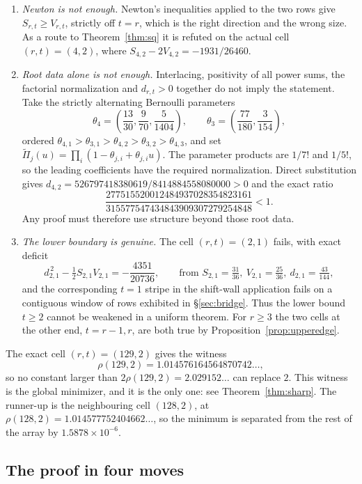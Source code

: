 \documentclass[11pt,a4paper]{article}
\theoremstyle{plain}
\theoremstyle{definition}
\theoremstyle{remark}
\begin{document}
\begin{enumerate}[label=\textup{(\alph*)},leftmargin=2.2em]
\item \emph{Newton is not enough.} Newton's inequalities applied to the two rows
  give $S_{r,t}\ge V_{r,t}$, strictly off $t=r$, which is the right direction
  and the wrong size. As a
  route to Theorem~\ref{thm:sq} it is refuted on the actual cell $(r,t)=(4,2)$,
  where $S_{4,2}-2V_{4,2}=-1931/26460$.
\item \emph{Root data alone is not enough.} Interlacing, positivity of all power
  sums, the factorial normalization and $d_{r,t}>0$ together do not imply the
  statement. Take the strictly alternating Bernoulli parameters
  \[
    \theta_4=\left(\frac{13}{30},\frac9{70},\frac5{1404}\right),\qquad
    \theta_3=\left(\frac{77}{180},\frac3{154}\right),
  \]
  ordered $\theta_{4,1}>\theta_{3,1}>\theta_{4,2}>
  \theta_{3,2}>\theta_{4,3}$, and set
  $\widetilde\Pi_j(u)=\prod_i(1-\theta_{j,i}+\theta_{j,i}u)$. The parameter
  products are $1/7!$ and $1/5!$, so the leading coefficients have the required
  normalization. Direct substitution gives
  $d_{4,2}=526797418380619/8414884558080000>0$ and the exact ratio
  \[
    \frac{277515520012484937028354823161}
         {315577547434843909307279254848}<1.
  \]
  Any proof must therefore use structure beyond those root data.
\item \emph{The lower boundary is genuine.} The cell
  $(r,t)=(2,1)$ fails, with exact deficit
  \[
    d_{2,1}^{\,2}-\tfrac12 S_{2,1}V_{2,1}=-\frac{4351}{20736},
    \qquad\text{from } S_{2,1}=\tfrac{31}{36},\ V_{2,1}=\tfrac{25}{36},\
    d_{2,1}=\tfrac{43}{144},
  \]
  and the corresponding $t=1$ stripe in the shift-wall application fails on a
  contiguous window of rows exhibited in \S\ref{sec:bridge}. Thus the lower
  bound $t\ge2$ cannot be weakened in a uniform theorem. For $r\ge3$ the two
  cells at the other end, $t=r-1,r$, are both true by
  Proposition~\ref{prop:upperedge}.
\end{enumerate}

The exact cell $(r,t)=(129,2)$ gives the witness
\[
  \rho(129,2)=1.014576164564870742\ldots,
\]
so no constant larger than $2\rho(129,2)=2.029152\ldots$ can replace $2$.
This witness is the global minimizer, and it is the only one: see
Theorem~\ref{thm:sharp}. The runner-up is the neighbouring cell $(128,2)$, at
$\rho(128,2)=1.014577752404662\ldots$, so the minimum is separated from the
rest of the array by $1.5878\times10^{-6}$.

\subsection{The proof in four moves}
\end{document}
